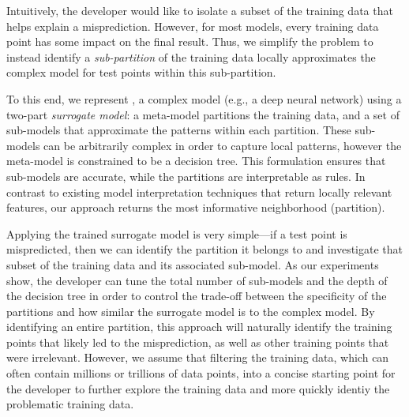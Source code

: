 

Intuitively, the developer would like to isolate a subset of the training data that helps explain a misprediction. 
However, for most models, every training data point has some impact on the final result.
Thus, we simplify the problem to instead identify a {\it sub-partition} of the training data locally approximates the complex model for test points within this sub-partition.  

To this end, we represent \sys,  a complex model (e.g., a deep neural network) using a two-part {\it surrogate model}: a meta-model partitions the training data, and a set of sub-models that approximate the patterns within each partition.
These sub-models can be arbitrarily complex in order to capture local patterns, however the meta-model is constrained to be a decision tree.
This formulation ensures that sub-models are accurate, while the partitions are interpretable as rules.
In contrast to existing model interpretation techniques that return locally relevant features, our approach returns the most informative neighborhood (partition).

Applying the trained surrogate model is very simple---if a test point is mispredicted, then we can identify the partition it belongs to and investigate that subset of the training data and its associated sub-model.
As our experiments show, the developer can tune the total number of sub-models and the depth of the decision tree in order to control the trade-off between the specificity of the partitions and how similar the surrogate model is to the complex model.
By identifying an entire partition, this approach will naturally identify the training points that likely led to the misprediction, as well as other training points that were irrelevant.   However, we assume that filtering the training data, which can often contain millions or trillions of data points, into a concise starting point for the developer to further explore the training data and more quickly identiy the problematic training data.

